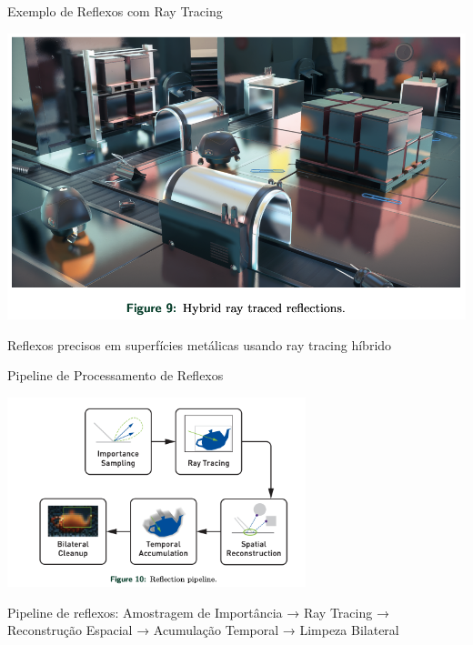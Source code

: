 \documentclass[aspectratio=169,xcolor=table]{beamer}
\begin{document}
\begin{frame}{Exemplo de Reflexos com Ray Tracing}
    \begin{center}
        \includegraphics[height=0.8\textheight]{reflections}
    \end{center}
    \begin{center}
        \small{Reflexos precisos em superfícies metálicas usando ray tracing híbrido}
    \end{center}
\end{frame}

\begin{frame}{Pipeline de Processamento de Reflexos}
    \begin{center}
        \includegraphics[width=0.65\textwidth]{reflections-pipeline}
    \end{center}
    \begin{center}
        \small{Pipeline de reflexos: Amostragem de Importância → Ray Tracing → Reconstrução Espacial → Acumulação Temporal → Limpeza Bilateral}
    \end{center}
\end{frame}
\end{document}

